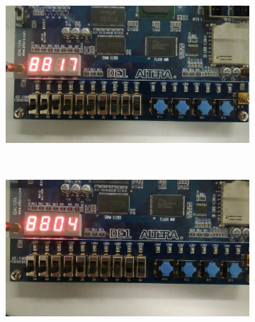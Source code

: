 \begin{figure}[H]
		\begin{subfigure}[b]{0.44\textwidth}
			\includegraphics[width=\textwidth]{img/etapa3/3}
			\label{fig:etapa3-12}
		\end{subfigure}
		~
		\begin{subfigure}[b]{0.44\textwidth}
			\includegraphics[width=\textwidth]{img/etapa3/4}
			\label{fig:etapa3-13}

		\end{subfigure}


\end{figure}
